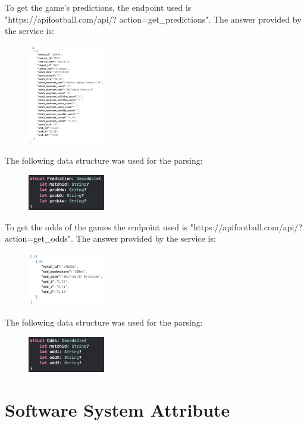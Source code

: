 \documentclass[numbers=noenddot, 12pt, a4paper, oneside]{scrbook}
\begin{document}
To get the game’s predictions, the endpoint used is "https://apifootball.com/api/? action=get\_predictions". The answer provided by the service is:
\begin{figure}[H]
	\centering
	\includegraphics[width=0.3\textwidth]{images/ResponsePrediction}
\end{figure}
The following data structure was used for the parsing:
\begin{figure}[H]
	\centering
	\includegraphics[width=0.3\textwidth]{images/StructPrediction}
\end{figure}
To get the odds of the games the endpoint used is "https://apifootball.com/api/? action=get\_odds". The answer provided by the service is:
\begin{figure}[H]
	\centering
	\includegraphics[width=0.3\textwidth]{images/ResponseOdds}
\end{figure}
The following data structure was used for the parsing:
\begin{figure}[H]
	\centering
	\includegraphics[width=0.3\textwidth]{images/StructOdds}
\end{figure}


\chapter{Software System Attribute}
\end{document}
